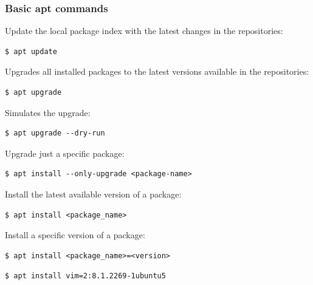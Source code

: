 \documentclass{article}
\newenvironment{codetemplate}[1][]{%
  \mybasecolorbox[#1]
  \itshape
}{%
  \endmybasecolorbox
}
\begin{document}
\subsubsection{Basic apt commands}

Update the local package index with the latest changes in the repositories:
\begin{codetemplate}
\begin{verbatim}
$ apt update
\end{verbatim}
\end{codetemplate}

Upgrades all installed packages to the latest versions available in the repositories:
\begin{codetemplate}
\begin{verbatim}
$ apt upgrade
\end{verbatim}
\end{codetemplate}

Simulates the upgrade:
\begin{codetemplate}
\begin{verbatim}
$ apt upgrade --dry-run
\end{verbatim}
\end{codetemplate}

Upgrade just a specific package:
\begin{codetemplate}
\begin{verbatim}
$ apt install --only-upgrade <package-name>
\end{verbatim}
\end{codetemplate}

Install the latest available version of a package:
\begin{codetemplate}
\begin{verbatim}
$ apt install <package_name>
\end{verbatim}
\end{codetemplate}

Install a specific version of a package:
\begin{codetemplate}
\begin{verbatim}
$ apt install <package_name>=<version>
\end{verbatim}
\end{codetemplate}
\begin{codetemplate}
\begin{verbatim}
$ apt install vim=2:8.1.2269-1ubuntu5
\end{verbatim}
\end{codetemplate}
\end{document}
